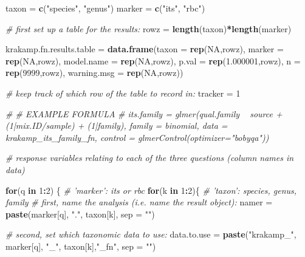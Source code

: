 \documentclass[
]{article}
\newenvironment{Shaded}{\begin{snugshade}}{\end{snugshade}}
\newcommand{\CommentTok}[1]{\textcolor[rgb]{0.56,0.35,0.01}{\textit{#1}}}
\newcommand{\ControlFlowTok}[1]{\textcolor[rgb]{0.13,0.29,0.53}{\textbf{#1}}}
\newcommand{\DataTypeTok}[1]{\textcolor[rgb]{0.13,0.29,0.53}{#1}}
\newcommand{\DecValTok}[1]{\textcolor[rgb]{0.00,0.00,0.81}{#1}}
\newcommand{\FloatTok}[1]{\textcolor[rgb]{0.00,0.00,0.81}{#1}}
\newcommand{\KeywordTok}[1]{\textcolor[rgb]{0.13,0.29,0.53}{\textbf{#1}}}
\newcommand{\NormalTok}[1]{#1}
\newcommand{\OperatorTok}[1]{\textcolor[rgb]{0.81,0.36,0.00}{\textbf{#1}}}
\newcommand{\OtherTok}[1]{\textcolor[rgb]{0.56,0.35,0.01}{#1}}
\newcommand{\StringTok}[1]{\textcolor[rgb]{0.31,0.60,0.02}{#1}}
\begin{document}
\begin{Shaded}
\begin{Highlighting}[]
\NormalTok{taxon =}\StringTok{ }\KeywordTok{c}\NormalTok{(}\StringTok{"species"}\NormalTok{, }\StringTok{"genus"}\NormalTok{)}
\NormalTok{marker =}\StringTok{ }\KeywordTok{c}\NormalTok{(}\StringTok{"its"}\NormalTok{, }\StringTok{"rbc"}\NormalTok{)}


\CommentTok{# first set up a table for the results:}
\NormalTok{rowz =}\StringTok{ }\KeywordTok{length}\NormalTok{(taxon)}\OperatorTok{*}\KeywordTok{length}\NormalTok{(marker)}

\NormalTok{krakamp.fn.results.table =}\StringTok{ }\KeywordTok{data.frame}\NormalTok{(}\DataTypeTok{taxon  =} \KeywordTok{rep}\NormalTok{(}\OtherTok{NA}\NormalTok{,rowz), }\DataTypeTok{marker  =} \KeywordTok{rep}\NormalTok{(}\OtherTok{NA}\NormalTok{,rowz), }\DataTypeTok{model.name =} \KeywordTok{rep}\NormalTok{(}\OtherTok{NA}\NormalTok{,rowz), }\DataTypeTok{p.val  =} \KeywordTok{rep}\NormalTok{(}\FloatTok{1.000001}\NormalTok{,rowz), }\DataTypeTok{n  =} \KeywordTok{rep}\NormalTok{(}\DecValTok{9999}\NormalTok{,rowz), }\DataTypeTok{warning.msg =} \KeywordTok{rep}\NormalTok{(}\OtherTok{NA}\NormalTok{,rowz))}

\CommentTok{# keep track of which row of the table to record in:}
\NormalTok{tracker =}\StringTok{ }\DecValTok{1}

\CommentTok{# # EXAMPLE FORMULA}
\CommentTok{# its.family = glmer(qual.family ~ source + (1|mix.ID/sample) + (1|family), family = binomial, data = krakamp_its_family_fn, control = glmerControl(optimizer="bobyqa"))}

\CommentTok{# response variables relating to each of the three questions (column names in data)}

\ControlFlowTok{for}\NormalTok{(q }\ControlFlowTok{in} \DecValTok{1}\OperatorTok{:}\DecValTok{2}\NormalTok{) \{ }\CommentTok{# 'marker': its or rbc}
    \ControlFlowTok{for}\NormalTok{(k }\ControlFlowTok{in} \DecValTok{1}\OperatorTok{:}\DecValTok{2}\NormalTok{)\{ }\CommentTok{# 'taxon': species, genus, family}
        \CommentTok{# first, name the analysis (i.e. name the result object):}
\NormalTok{        namer =}\StringTok{ }\KeywordTok{paste}\NormalTok{(marker[q], }\StringTok{"."}\NormalTok{, taxon[k], }\DataTypeTok{sep =} \StringTok{""}\NormalTok{)}
        
        \CommentTok{# second, set which taxonomic data to use:}
\NormalTok{        data.to.use =}\StringTok{ }\KeywordTok{paste}\NormalTok{(}\StringTok{"krakamp_"}\NormalTok{, marker[q], }\StringTok{"_"}\NormalTok{, taxon[k],}\StringTok{"_fn"}\NormalTok{, }\DataTypeTok{sep =} \StringTok{""}\NormalTok{)}
        

\end{Highlighting}
\end{Shaded}
\end{document}
